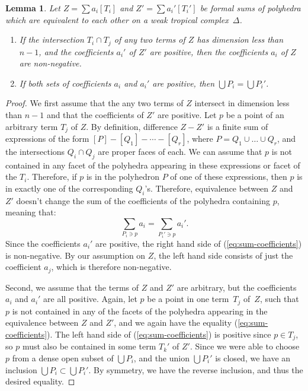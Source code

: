 \documentclass[11pt]{amsart}
\newtheorem{lem}[thm]{Lemma}
\theoremstyle{definition}
\begin{document}
\begin{lem}\label{l:subdivision-effective}
Let $Z = \sum a_i [T_i]$ and $Z' = \sum a_i' [T_i']$ be formal sums of
polyhedra which are equivalent to each other on a weak tropical
complex~$\Delta$.
\begin{enumerate}
\item If the intersection $T_i \cap T_j$ of any two terms of $Z$ has dimension
less than $n-1$, and the coefficients $a_i'$ of $Z'$ are positive, then the
coefficients $a_i$ of $Z$ are non-negative.
\item If both sets of coefficients $a_i$ and $a_i'$ are positive, then
$\bigcup P_i = \bigcup P_i'$.
\end{enumerate}
\end{lem}

\begin{proof}
We first assume that the any two terms of $Z$ intersect in dimension less than
$n-1$ and that the coefficients of $Z'$ are positive. Let $p$ be a point of an
arbitrary
term $T_j$ of $Z$. By definition, difference $Z - Z'$ is a finite sum of
expressions of the form $[P] - [Q_1] - \cdots - [Q_r]$, where $P = Q_1 \cup
\ldots \cup Q_r$, and the intersections $Q_i \cap Q_j$ are proper faces of each.
We can assume that $p$ is not contained in any facet of the polyhedra appearing
in these expressions or facet of the $T_i$. Therefore, if $p$ is in the
polyhedron $P$ of one of these expressions, then $p$ is in exactly one of the
corresponding $Q_i$'s. Therefore, equivalence between $Z$ and $Z'$ doesn't
change the sum of the coefficients of the polyhedra containing $p$, meaning
that: \begin{equation}\label{eq:sum-coefficients}
\sum_{P_i \ni p} a_i = \sum_{P_i' \ni p} a_i'.
\end{equation}
Since the coefficients $a_i'$ are positive, the right hand side of
(\ref{eq:sum-coefficients}) is non-negative. By our assumption on $Z$, the left
hand side consists of just the coefficient $a_j$, which is therefore
non-negative.

Second, we assume that the terms of $Z$ and $Z'$ are arbitrary, but the
coefficients $a_i$ and $a_i'$ are all positive. Again, let $p$ be a point in one
term~$T_j$ of~$Z$, such that $p$ is not contained in any of the facets of the
polyhedra appearing in the equivalence between $Z$ and $Z'$, and we again have
the equality (\ref{eq:sum-coefficients}). The left hand side of
(\ref{eq:sum-coefficients}) is positive since $p \in T_j$, so $p$ must also be
contained in some term $T_k'$ of $Z'$. Since we were able to choose $p$ from a
dense open subset of $\bigcup P_i$, and the union $\bigcup P_i'$ is closed, we
have an inclusion $\bigcup P_i \subset \bigcup P_i'$. By symmetry, we have the
reverse inclusion, and thus the desired equality.
\end{proof}
\end{document}
